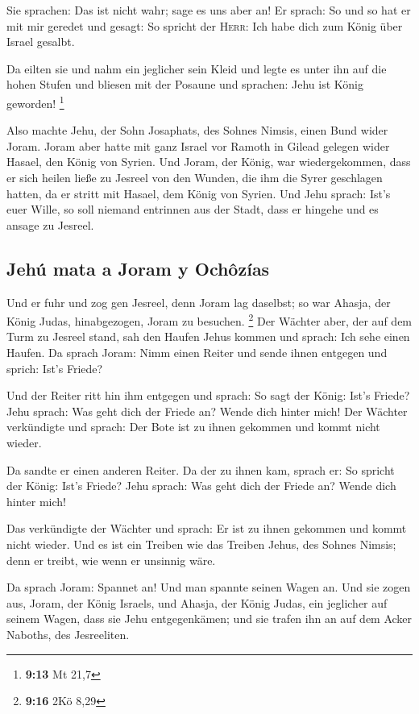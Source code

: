  Sie sprachen: Das ist nicht wahr; sage es uns aber an!
Er sprach: So und so hat er mit mir geredet und gesagt: So spricht der
\textsc{Herr}: Ich habe dich zum König über Israel gesalbt.

 Da eilten sie und nahm ein jeglicher sein Kleid und
legte es unter ihn auf die hohen Stufen und bliesen mit der Posaune und
sprachen: Jehu ist König geworden! \footnote{\textbf{9:13} Mt 21,7}

 Also machte Jehu, der Sohn Josaphats, des Sohnes Nimsis,
einen Bund wider Joram. Joram aber hatte mit ganz Israel vor Ramoth in
Gilead gelegen wider Hasael, den König von Syrien.  Und
Joram, der König, war wiedergekommen, dass er sich heilen ließe zu
Jesreel von den Wunden, die ihm die Syrer geschlagen hatten, da er
stritt mit Hasael, dem König von Syrien. Und Jehu sprach: Ist's euer
Wille, so soll niemand entrinnen aus der Stadt, dass er hingehe und es
ansage zu Jesreel.

\hypertarget{jehuxfa-mata-a-joram-y-ochuxf4zuxedas}{%
\subsection{Jehú mata a Joram y
Ochôzías}\label{jehuxfa-mata-a-joram-y-ochuxf4zuxedas}}

 Und er fuhr und zog gen Jesreel, denn Joram lag
daselbst; so war Ahasja, der König Judas, hinabgezogen, Joram zu
besuchen. \footnote{\textbf{9:16} 2Kö 8,29}  Der Wächter
aber, der auf dem Turm zu Jesreel stand, sah den Haufen Jehus kommen und
sprach: Ich sehe einen Haufen. Da sprach Joram: Nimm einen Reiter und
sende ihnen entgegen und sprich: Ist's Friede?

 Und der Reiter ritt hin ihm entgegen und sprach: So sagt
der König: Ist's Friede? Jehu sprach: Was geht dich der Friede an? Wende
dich hinter mich! Der Wächter verkündigte und sprach: Der Bote ist zu
ihnen gekommen und kommt nicht wieder.

 Da sandte er einen anderen Reiter. Da der zu ihnen kam,
sprach er: So spricht der König: Ist's Friede? Jehu sprach: Was geht
dich der Friede an? Wende dich hinter mich!

 Das verkündigte der Wächter und sprach: Er ist zu ihnen
gekommen und kommt nicht wieder. Und es ist ein Treiben wie das Treiben
Jehus, des Sohnes Nimsis; denn er treibt, wie wenn er unsinnig wäre.

 Da sprach Joram: Spannet an! Und man spannte seinen
Wagen an. Und sie zogen aus, Joram, der König Israels, und Ahasja, der
König Judas, ein jeglicher auf seinem Wagen, dass sie Jehu
entgegenkämen; und sie trafen ihn an auf dem Acker Naboths, des
Jesreeliten.

